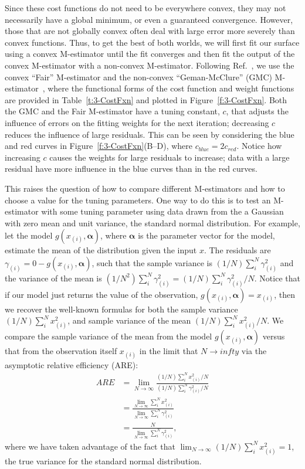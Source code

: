 Since these cost functions do not need to be everywhere convex, they may not necessarily have a global minimum, or even a guaranteed convergence.
However, those that are not globally convex often deal with large error more severely than convex functions.
Thus, to get the best of both worlds, we will first fit our surface using a convex M-estimator until the fit converges and then fit the output of the convex M-estimator with a non-convex M-estimator.
Following Ref.~\cite{RN31}, we use the convex ``Fair'' M-estimator and the non-convex ``Geman-McClure'' (GMC) M-estimator~\cite{RN52}, where the functional forms of the cost function and weight functions are provided in Table~\ref{t:3-CostFxn} and plotted in Figure~\ref{f:3-CostFxn}.
Both the GMC and the Fair M-estimator have a tuning constant, $c$, that adjusts the influence of errors on the fitting weights for the next iteration; decreasing $c$ reduces the influence of large residuals.
This can be seen by considering the blue and red curves in Figure~\ref{f:3-CostFxn}(B--D), where $c_{blue} = 2c_{red}$.
Notice how increasing $c$ causes the weights for large residuals to increase; data with a large residual have more influence in the blue curves than in the red curves.

This raises the question of how to compare different M-estimators and how to choose a value for the tuning parameters.
One way to do this is to test an M-estimator with some tuning parameter using data drawn from the a Gaussian with zero mean and unit variance, the standard normal distribution.
For example, let the model $g(x_{(i)},\bm{\alpha})$, where $\bm{\alpha}$ is the parameter vector for the model, estimate the mean of the distribution given the input $x$.
The residuals are $\gamma_{(i)} = 0 - g(x_{(i)},\bm{\alpha})$, such that the sample variance is $(1/N)\sum_i^N \gamma_{(i)}^2$ and the variance of the mean is $(1/N^2)\sum_i^N \gamma_{(i)}^2 = (1/N)\sum_i^N \gamma_{(i)}^2/N$.
Notice that if our model just returns the value of the observation, $g(x_{(i)},\bm{\alpha}) = x_{(i)}$, then we recover the well-known formulas for both the sample variance $(1/N)\sum_i^N x_{(i)}^2$, and sample variance of the mean $(1/N)\sum_i^N x_{(i)}^2/N$.
We compare the sample variance of the mean from the model $g(x_{(i)},\bm{\alpha})$ versus that from the observation itself $x_{(i)}$ in the limit that $N \to infty$ via the asymptotic relative efficiency (ARE):
\begin{align}
  ARE &= \lim_{N \to \infty} \frac{(1/N)\sum\limits_i^N x_{(i)}^2/N}{(1/N)\sum\limits_i^N \gamma_{(i)}^2/N}\\
  &= \frac{\lim_{N \to \infty} \sum\limits_i^N x_{(i)}^2}{\lim_{N \to \infty} \sum\limits_i^N \gamma_{(i)}^2}\\
  &= \frac{N}{\lim_{N \to \infty} \sum\limits_i^N \gamma_{(i)}^2},
\end{align}
where we have taken advantage of the fact that $\lim_{N \to \infty} (1/N)\sum_i^N x_{(i)}^2 = 1$, the true variance for the standard normal distribution.

